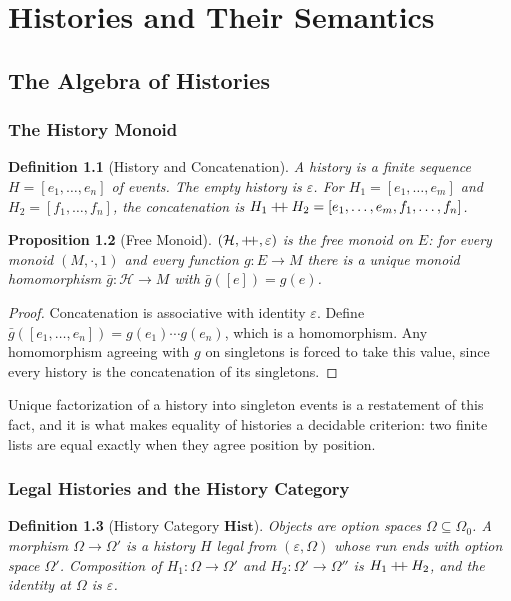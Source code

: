 \documentclass[12pt,oneside,openany]{book}
\theoremstyle{spherepop}
\newtheorem{definition}{Definition}[chapter]
\newtheorem{proposition}[definition]{Proposition}
\theoremstyle{remarkstyle}
\newcommand{\Hist}{\mathbf{Hist}}
\newcommand{\hconcat}{\mathbin{+\mkern-5mu+}}
\newcommand{\calH}{\mathcal{H}}
\begin{document}
\part{Histories and Their Semantics}

\chapter{The Algebra of Histories}
\label{ch:algebra}

\section{The History Monoid}

\begin{definition}[History and Concatenation]
A \emph{history} is a finite sequence $H=[e_1,\dots,e_n]$ of events. The empty history is $\varepsilon$. For $H_1=[e_1,\dots,e_m]$ and $H_2=[f_1,\dots,f_n]$, the concatenation is $H_1\hconcat H_2=[e_1,\dots,e_m,f_1,\dots,f_n]$.
\end{definition}

\begin{proposition}[Free Monoid]
$(\calH,\hconcat,\varepsilon)$ is the free monoid on $E$: for every monoid $(M,\cdot,1)$ and every function $g:E\to M$ there is a unique monoid homomorphism $\bar g:\calH\to M$ with $\bar g([e])=g(e)$.
\end{proposition}

\begin{proof}
Concatenation is associative with identity $\varepsilon$. Define $\bar g([e_1,\dots,e_n])=g(e_1)\cdots g(e_n)$, which is a homomorphism. Any homomorphism agreeing with $g$ on singletons is forced to take this value, since every history is the concatenation of its singletons.
\end{proof}

Unique factorization of a history into singleton events is a restatement of this fact, and it is what makes equality of histories a decidable criterion: two finite lists are equal exactly when they agree position by position.

\section{Legal Histories and the History Category}

\begin{definition}[History Category $\Hist$]
\label{def:hist-category}
Objects are option spaces $\Omega\subseteq\Omega_0$. A morphism $\Omega\to\Omega'$ is a history $H$ legal from $(\varepsilon,\Omega)$ whose run ends with option space $\Omega'$. Composition of $H_1:\Omega\to\Omega'$ and $H_2:\Omega'\to\Omega''$ is $H_1\hconcat H_2$, and the identity at $\Omega$ is $\varepsilon$.
\end{definition}
\end{document}
